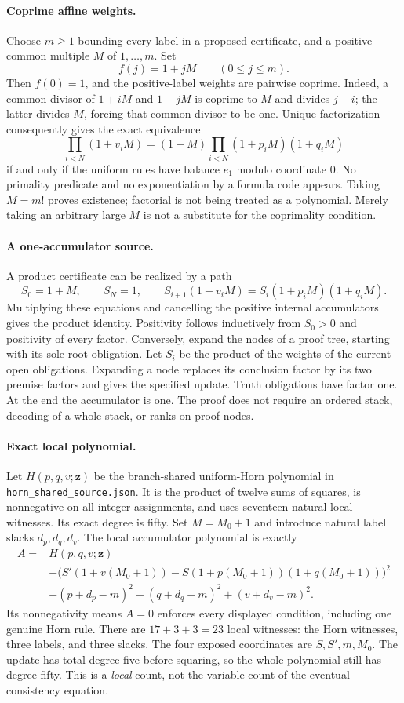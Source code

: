\paragraph{Coprime affine weights.}
Choose $m\geq1$ bounding every label in a proposed certificate, and a
positive common multiple $M$ of $1,\ldots,m$. Set
\[
 f(j)=1+jM\qquad(0\leq j\leq m).
\]
Then $f(0)=1$, and the positive-label weights are pairwise coprime.
Indeed, a common divisor of $1+iM$ and $1+jM$ is coprime to $M$ and divides
$j-i$; the latter divides $M$, forcing that common divisor to be one.
Unique factorization consequently gives the exact equivalence
\[
 \prod_{i<N}(1+v_iM)
 = (1+M)\prod_{i<N}(1+p_iM)(1+q_iM)
\]
if and only if the uniform rules have balance $e_1$ modulo coordinate $0$.
No primality predicate and no exponentiation by a formula code appears.
Taking $M=m!$ proves existence; factorial is not being treated as a polynomial.
Merely taking an arbitrary large $M$ is not a substitute for the coprimality
condition.

\paragraph{A one-accumulator source.}
A product certificate can be realized by a path
\[
 S_0=1+M,\qquad S_N=1,\qquad
 S_{i+1}(1+v_iM)=S_i(1+p_iM)(1+q_iM).
\]
Multiplying these equations and cancelling the positive internal
accumulators gives the product identity. Positivity follows inductively
from $S_0>0$ and positivity of every factor. Conversely, expand the nodes
of a proof tree, starting with its sole root obligation. Let $S_i$ be the
product of the weights of the current open obligations. Expanding a node
replaces its conclusion factor by its two premise factors and gives the
specified update. Truth obligations have factor one. At the end the
accumulator is one. The proof does not require an ordered stack, decoding
of a whole stack, or ranks on proof nodes.

\paragraph{Exact local polynomial.}
Let $H(p,q,v;\boldsymbol z)$ be the branch-shared uniform-Horn polynomial
in \texttt{horn\_shared\_source.json}. It is the product of twelve sums
of squares, is nonnegative on all integer assignments, and uses seventeen
natural local witnesses. Its exact degree is fifty. Set $M=M_0+1$ and
introduce natural label slacks $d_p,d_q,d_v$. The local accumulator
polynomial is exactly
\begin{align*}
 A={}&H(p,q,v;\boldsymbol z)\\
 &+\bigl(S'(1+v(M_0+1))-S(1+p(M_0+1))(1+q(M_0+1))\bigr)^2\\
 &+(p+d_p-m)^2+(q+d_q-m)^2+(v+d_v-m)^2.
\end{align*}
Its nonnegativity means $A=0$ enforces every displayed condition, including
one genuine Horn rule. There are $17+3+3=23$ local witnesses: the Horn
witnesses, three labels, and three slacks. The four exposed coordinates
are $S,S',m,M_0$. The update has total degree five before squaring, so the
whole polynomial still has degree fifty. This is a \emph{local} count,
not the variable count of the eventual consistency equation.


